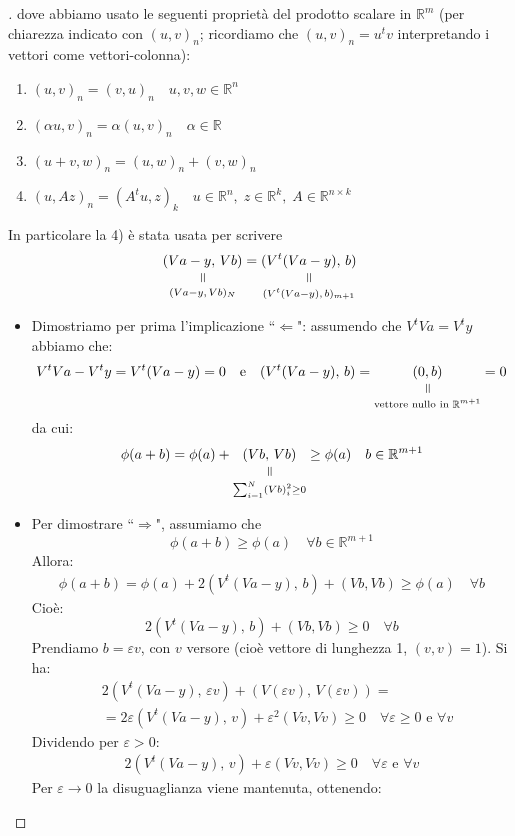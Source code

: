 \documentclass[12pt,a4paper]{article}
\newcommand{\verteq}{\rotatebox{90}{$\,=$}}
\newcommand{\equalto}[2]{\underset{\scriptstyle\overset{\mkern4mu\verteq}{#2}}{#1}}
\begin{document}
\begin{proof}[\unskip\nopunct]
dove abbiamo usato le seguenti proprietà del prodotto scalare in $\mathbb{R}^{m}$ (per chiarezza indicato con $(u,v)_n$; ricordiamo che $(u,v)_n=u^tv$ interpretando i vettori come vettori-colonna):
\begin{enumerate}
\item $(u,v)_n=(v,u)_n \quad u,v,w \in \mathbb{R}^{n}$
\item $(\alpha u,v)_n= \alpha(u,v)_n \quad \alpha \in \mathbb{R}$
\item $(u+v,w)_n=(u,w)_n+(v,w)_n$
\item $(u,Az)_n = (A^tu,z)_k \quad u \in \mathbb{R}^{n}, \; z \in \mathbb{R}^{k}, \; A \in \mathbb{R}^{n \times k}$
\end{enumerate}
In particolare la 4) è stata usata per scrivere
\[
    \equalto{(Va-y, \, Vb)}{(Va-y, \, Vb)_N} = \equalto{(V^t(Va-y), \, b)}{(V^t(Va-y), \, b)_{m+1}}
\]
\begin{itemize}
\item Dimostriamo per prima l'implicazione ``$\Leftarrow$": assumendo che $V^t Va=V^t y$ abbiamo che:
\[
	V^tVa-V^ty=V^t(Va-y)=0 \quad \text{e} \quad (V^t(Va-y), \, b)=\equalto{(0,b)}{\text{vettore nullo in }\mathbb{R}^{m+1}} =0
\]
da cui:
\[ \begin{split}
	\phi(a+b)=\phi(a)+ \equalto{(Vb,\, Vb)}{\sum_{i=1}^{N}(Vb)_i^2 \geq 0} \geq \phi(a) \quad b \in \mathbb{R}^{m+1}
\end{split} \]
\item Per dimostrare ``$\Rightarrow$", assumiamo che
\[
	\phi(a+b) \geq \phi(a) \quad \forall b \in \mathbb{R}^{m+1}
\]
Allora:
\[ \begin{split}
	\phi(a+b)=\phi(a)+2(V^t(Va-y), \, b)+(Vb,Vb) \geq \phi(a) \quad \forall b
\end{split} \]
Cioè:
\[
	2(V^t(Va-y), \, b) + (Vb,Vb) \geq 0 \quad \forall b
\]
Prendiamo $b=\varepsilon v$, con $v$ versore (cioè vettore di lunghezza 1, $(v,v)=1$). Si ha:
\[ \begin{split}
	& 2(V^t(Va-y), \, \varepsilon v)+(V(\varepsilon v), \, V(\varepsilon v)) = \\
	& = 2\varepsilon (V^t(Va-y), \, v) + \varepsilon^2(Vv,Vv) \geq 0 \quad \forall \varepsilon \geq 0 \text{ e } \forall v
\end{split} \]
Dividendo per $\varepsilon > 0$:
\[ \begin{split}
	2(V^t(Va-y), \, v) + \varepsilon(Vv,Vv) \geq 0 \quad \forall \varepsilon \text{ e } \forall v
\end{split} \]
Per $\varepsilon \to 0$ la disuguaglianza viene mantenuta, ottenendo:

\end{itemize}
\end{proof}
\end{document}
